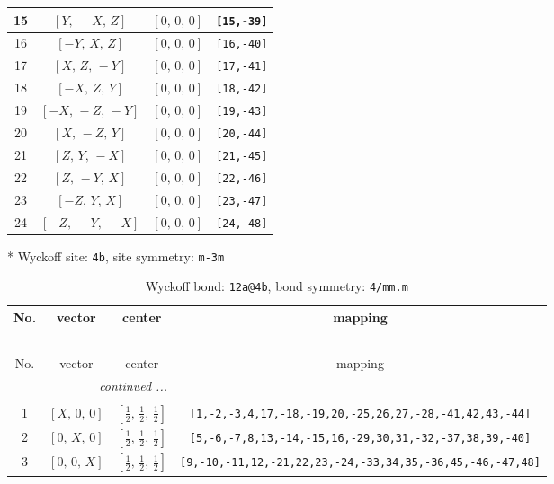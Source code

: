 \documentclass[fleqn,8pt]{jsarticle}
\begin{document}
\begin{longtable}{cccc}
15 & $\left[ Y,\, - X,\, Z \right]$ & $\left[ 0,\, 0,\, 0 \right]$ & {\tt [15,-39]} \\ \hline
16 & $\left[ - Y,\, X,\, Z \right]$ & $\left[ 0,\, 0,\, 0 \right]$ & {\tt [16,-40]} \\ \hline
17 & $\left[ X,\, Z,\, - Y \right]$ & $\left[ 0,\, 0,\, 0 \right]$ & {\tt [17,-41]} \\ \hline
18 & $\left[ - X,\, Z,\, Y \right]$ & $\left[ 0,\, 0,\, 0 \right]$ & {\tt [18,-42]} \\ \hline
19 & $\left[ - X,\, - Z,\, - Y \right]$ & $\left[ 0,\, 0,\, 0 \right]$ & {\tt [19,-43]} \\ \hline
20 & $\left[ X,\, - Z,\, Y \right]$ & $\left[ 0,\, 0,\, 0 \right]$ & {\tt [20,-44]} \\ \hline
21 & $\left[ Z,\, Y,\, - X \right]$ & $\left[ 0,\, 0,\, 0 \right]$ & {\tt [21,-45]} \\ \hline
22 & $\left[ Z,\, - Y,\, X \right]$ & $\left[ 0,\, 0,\, 0 \right]$ & {\tt [22,-46]} \\ \hline
23 & $\left[ - Z,\, Y,\, X \right]$ & $\left[ 0,\, 0,\, 0 \right]$ & {\tt [23,-47]} \\ \hline
24 & $\left[ - Z,\, - Y,\, - X \right]$ & $\left[ 0,\, 0,\, 0 \right]$ & {\tt [24,-48]} \\
\end{longtable}
* Wyckoff site: {\tt 4b}, site symmetry: {\tt m-3m}
\renewcommand{\arraystretch}{1.2}
\begin{longtable}{cccc}
\caption{Wyckoff bond: {\tt 12a@4b}, bond symmetry: {\tt 4/mm.m}}
 \\
 \hline \hline
No. & vector & center & mapping \\ \hline \endfirsthead

\multicolumn{3}{l}{\tablename\ \thetable{}} \\
 \hline \hline
No. & vector & center & mapping \\ \hline \endhead

 \hline \hline
\multicolumn{3}{r}{\footnotesize\it continued ...} \\ \endfoot

 \hline \hline
\multicolumn{3}{r}{} \\ \endlastfoot

1 & $\left[ X,\, 0,\, 0 \right]$ & $\left[ \frac{1}{2},\, \frac{1}{2},\, \frac{1}{2} \right]$ & {\tt [1,-2,-3,4,17,-18,-19,20,-25,26,27,-28,-41,42,43,-44]} \\ \hline
2 & $\left[ 0,\, X,\, 0 \right]$ & $\left[ \frac{1}{2},\, \frac{1}{2},\, \frac{1}{2} \right]$ & {\tt [5,-6,-7,8,13,-14,-15,16,-29,30,31,-32,-37,38,39,-40]} \\ \hline
3 & $\left[ 0,\, 0,\, X \right]$ & $\left[ \frac{1}{2},\, \frac{1}{2},\, \frac{1}{2} \right]$ & {\tt [9,-10,-11,12,-21,22,23,-24,-33,34,35,-36,45,-46,-47,48]} \\
\end{longtable}
\end{document}
